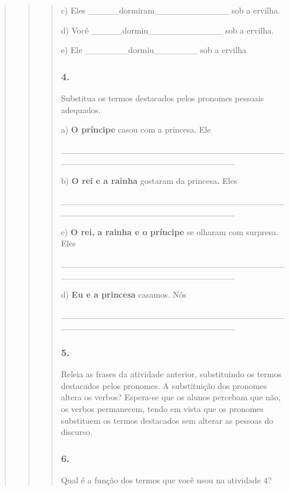 \begin{quote}
\begin{quote}
\begin{quote}
c) Eles \_\_\_\_\_dormiram\_\_\_\_\_\_\_\_\_\_\_\_ sob a ervilha.

d) Você \_\_\_\_\_dormiu\_\_\_\_\_\_\_\_\_\_\_\_ sob a ervilha.

e) Ele \_\_\_\_\_\_\_dormiu\_\_\_\_\_\_\_ sob a ervilha

\subsubsection{4. }\label{section-74}

Substitua os termos destacados pelos pronomes pessoais adequados.

a) \textbf{O príncipe} casou com a princesa. Ele

\_\_\_\_\_\_\_\_\_\_\_\_\_\_\_\_\_\_\_\_\_\_\_\_\_\_\_\_\_\_\_\_\_\_\_\_\_\_\_\_\_\_\_\_\_\_\_\_\_\_\_\_\_\_\_\_\_\_\_\_\_\_\_\_

b) \textbf{O rei e a rainha} gostaram da princesa\textbf{.} Eles

\_\_\_\_\_\_\_\_\_\_\_\_\_\_\_\_\_\_\_\_\_\_\_\_\_\_\_\_\_\_\_\_\_\_\_\_\_\_\_\_\_\_\_\_\_\_\_\_\_\_\_\_\_\_\_\_\_\_\_\_\_\_\_\_

c) \textbf{O rei, a rainha e o príncipe} se olharam com surpresa. Eles

\_\_\_\_\_\_\_\_\_\_\_\_\_\_\_\_\_\_\_\_\_\_\_\_\_\_\_\_\_\_\_\_\_\_\_\_\_\_\_\_\_\_\_\_\_\_\_\_\_\_\_\_\_\_\_\_\_\_\_\_\_\_\_\_

d) \textbf{Eu e a princesa} casamos. Nós

\_\_\_\_\_\_\_\_\_\_\_\_\_\_\_\_\_\_\_\_\_\_\_\_\_\_\_\_\_\_\_\_\_\_\_\_\_\_\_\_\_\_\_\_\_\_\_\_\_\_\_\_\_\_\_\_\_\_\_\_\_\_\_\_

\subsubsection{5. }\label{section-75}

Releia as frases da atividade anterior, substituindo os termos
destacados pelos pronomes. A substituição dos pronomes altera os verbos?
Espera-se que os alunos percebam que não, os verbos permanecem, tendo em
vista que os pronomes substituem os termos destacados sem alterar as
pessoas do discurso.

\subsubsection{6. }\label{section-76}

Qual é a função dos termos que você usou na atividade 4?


\end{quote}
\end{quote}
\end{quote}
